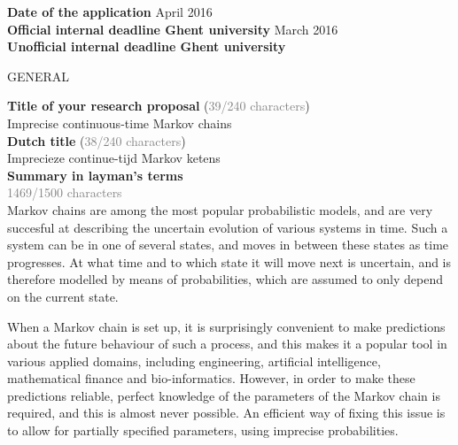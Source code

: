 \documentclass[11pt,dvipsnames,usenames,a4paper]{article}
\begin{document}
\newcommand{\todo}[1]{\textcolor{red}{\emph{#1}}}


{\bf Date of the application} \tab{} April 2016 \\
{\bf Official internal deadline Ghent university}  March 2016 \\
{\bf Unofficial internal deadline Ghent university}  \\


\begin{shaded}\centering GENERAL \end{shaded}
\textbf{Title of your research proposal} (\textcolor{Gray}{39/240 characters})\\
Imprecise continuous-time Markov chains\\[8pt]
\textbf{Dutch title} (\textcolor{Gray}{38/240 characters})\\
Imprecieze continue-tijd Markov ketens\\[8pt]
\textbf{Summary in layman's terms}\\
\textcolor{Gray}{1469/1500 characters}\\
Markov chains are among the most popular probabilistic models, and are very succesful at describing the uncertain evolution of various systems in time. Such a system can be in one of several states, and moves in between these states as time progresses. At what time and to which state it will move next is uncertain, and is therefore modelled by means of probabilities, which are assumed to only depend on the current state. 

When a Markov chain is set up, it is surprisingly convenient to make predictions about the future behaviour of such a process, and this makes it a popular tool in various applied domains, including engineering, artificial intelligence, mathematical finance and bio-informatics. However, in order to make these predictions reliable, perfect knowledge of the parameters of the Markov chain is required, and this is almost never possible. 
An efficient way of fixing this issue is to allow for partially specified parameters, using imprecise probabilities.
\end{document}
